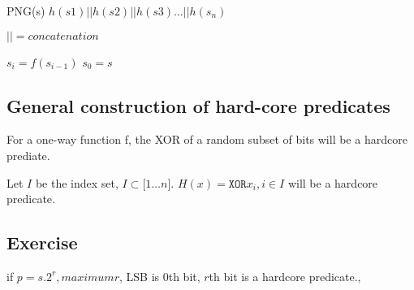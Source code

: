 PNG(s) $h(s1) || h(s2) || h(s3) ... || h(s_n)$

$|| = concatenation$

$s_i = f(s_{i - 1})$
$s_0 = s$


\subsection{General construction of hard-core predicates}

For a one-way function f, the XOR of a random subset of bits will be a hardcore
prediate.

Let $I$ be the index set, $I \subset \lbrack 1 \dots n \rbrack$.
$H(x) = \texttt{XOR} x_i, i \in I$ will be a hardcore predicate.


\subsection{Exercise}
if $p = s.2^r, maximum r$, LSB is $0$th bit, $r$th bit is a hardcore predicate.,
